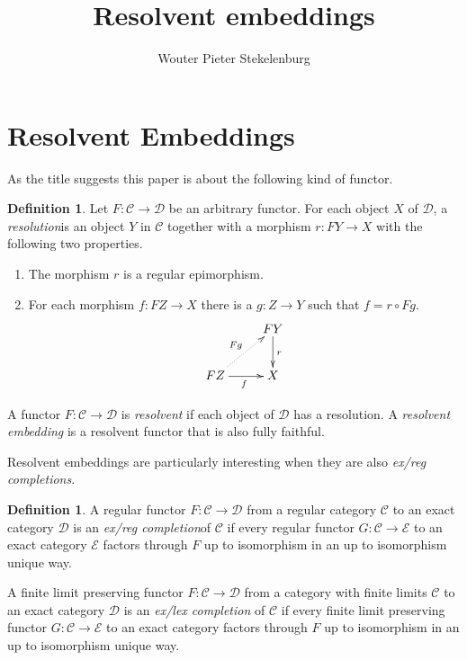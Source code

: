 \documentclass[sort&compress]{elsarticle}
\theoremstyle{plain}
\theoremstyle{definition}
\newtheorem{definition}[theorem]{Definition}
\theoremstyle{remark}
\newcommand\hide[1]{}
\newcommand\key[1]{\emph{#1}\label{#1}}
\newcommand\cat\mathcal
\newcommand\of:
\begin{document}
\begin{frontmatter}
\title{Resolvent embeddings}

\author[W. P. Stekelenburg]{Wouter Pieter Stekelenburg}
\address{Faculty of Mathematics, Informatics and Mechanics,
University of Warsaw,
Banacha 2,
02-097 Warszawa,
Poland}

\begin{abstract}
\end{abstract}

\begin{keyword}
\end{keyword}


\end{frontmatter}


\section{Resolvent Embeddings}
As the title suggests this paper is about the following kind of functor.

\begin{definition} Let $F\of \cat C\to\cat D$ be an arbitrary functor. For each object $X$ of $\cat D$, a \key{resolution} is an object $Y$ in $\cat C$ together with a morphism $r:FY\to X$ with the following two properties.
\begin{enumerate} 
\item The morphism $r$ is a regular epimorphism.
\item For each morphism $f\of FZ\to X$ there is a $g\of Z\to Y$ such that $f=r\circ Fg$.
\[ \xymatrix{
& FY \ar[d]^{r} \\
FZ\ar[r]_f \ar@{.>}[ur]^{Fg} & X
}\]
\end{enumerate}
A functor $F:\cat C\to\cat D$ is \key{resolvent} if each object of $\cat D$ has a resolution. A \emph{resolvent embedding} is a resolvent functor that is also fully faithful.
\end{definition}

Resolvent embeddings are particularly interesting when they are also \emph{ex/reg completions}.

\begin{definition} A regular functor $F\of\cat C\to\cat D$ from a regular category $\cat C$ to an exact category $\cat D$ is an \key{ex/reg completion} of $\cat C$ if every regular functor $G\of \cat C\to\cat E$ to an exact category $\cat E$ factors through $F$ up to isomorphism in an up to isomorphism unique way.

A finite limit preserving functor $F\of\cat C\to\cat D$ from a category with finite limits $\cat C$ to an exact category $\cat D$ is an \key{ex/lex completion} of $\cat C$ if every finite limit preserving functor $G\of \cat C\to\cat E$ to an exact category factors through $F$ up to isomorphism in an up to isomorphism unique way.
\end{definition}\hide{It is clear that completions are fully faithful? How does this follow from the universal property?}
\end{document}
